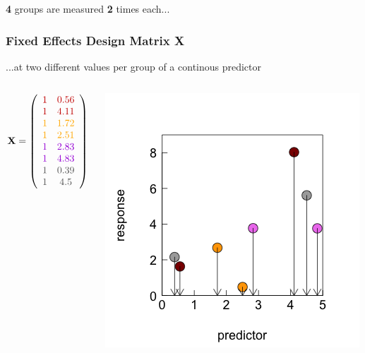 \documentclass{beamer}
\begin{document}
\begin{frame}[fragile]
\begin{columns}
\begin{column}{0.5\textwidth}
        \end{column}
    \end{columns}
    \vspace{0.3cm}
    
    \large\textbf{4} groups are measured \textbf{2} times each...
\end{frame}

\begin{frame}
\frametitle{Fixed Effects Design Matrix X}
\large ...at two different values per group of a continous predictor
\begin{columns}
        \begin{column}{0.5\textwidth}
            \[
\mathbf{X} = \left( 
\begin{array}{cc} 
\color{darkred}{1} & \color{darkred}{0.56} \\ 
\color{darkred}{1} & \color{darkred}{4.11} \\ 
\color{orange}{1} & \color{orange}{1.72} \\ 
\color{orange}{1} & \color{orange}{2.51} \\ 
\color{violet}{1} & \color{violet}{2.83} \\ 
\color{violet}{1} & \color{violet}{4.83} \\ 
\color{darkgray}{1} & \color{darkgray}{0.39} \\ 
\color{darkgray}{1} & \color{darkgray}{4.5} 
\end{array}\right)
\]
        \end{column}
        \begin{column}{0.5\textwidth}
            \includegraphics[width=\textwidth]{lectures/day_5_theory_of_mems/figures/unnamed-chunk-4-1.png}
        \end{column}
    \end{columns}

\end{frame}
\end{document}
